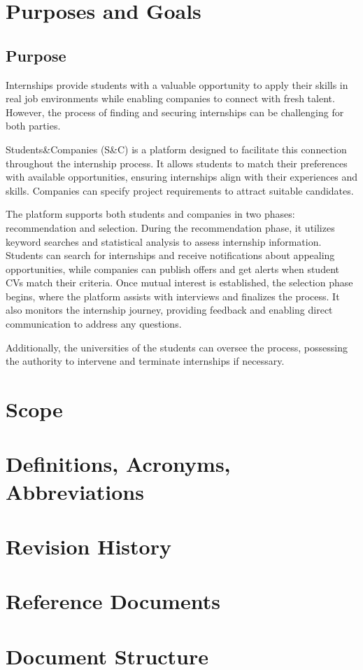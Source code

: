 
\renewcommand{\thesection}{\Alph{section}}
\section{Purposes and Goals}
\label{sec:purposeandgoals}
\subsection{Purpose}
\label{sec:purpose}
Internships provide students with a valuable opportunity to apply their skills in real job environments while enabling companies to connect with 
fresh talent. However, the process of finding and securing internships can be challenging for both parties.

Students\&Companies (S\&C) is a platform designed to facilitate this connection throughout the internship process. It allows 
students to match their preferences with available opportunities, ensuring internships align with their experiences and skills. 
Companies can specify project requirements to attract suitable candidates.

The platform supports both students and companies in two phases: recommendation and selection. During the recommendation phase, 
it utilizes keyword searches and statistical analysis to assess internship information. Students can search for internships and receive 
notifications about appealing opportunities, while companies can publish offers and get alerts when student CVs match their criteria.
Once mutual interest is established, the selection phase begins, where the platform assists with interviews and finalizes the process. 
It also monitors the internship journey, providing feedback and enabling direct communication to address any questions.

Additionally, the universities of the students can oversee the process, possessing the authority to intervene and terminate internships 
if necessary.

\section{Scope}
\label{sec:Scope}

\section{Definitions, Acronyms, Abbreviations}
\label{sec:definitions}

\section{Revision History}
\label{sec:revision}

\section{Reference Documents}
\label{sec:reference}

\section{Document Structure}
\label{sec:structure}
